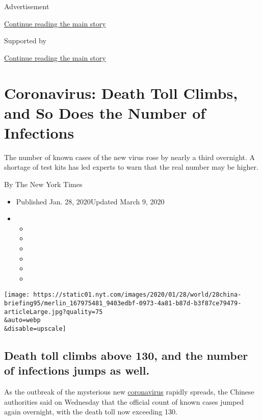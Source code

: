 Advertisement

\protect\hyperlink{after-top}{Continue reading the main story}

Supported by

\protect\hyperlink{after-sponsor}{Continue reading the main story}

\hypertarget{coronavirus-death-toll-climbs-and-so-does-the-number-of-infections}{%
\section{Coronavirus: Death Toll Climbs, and So Does the Number of
Infections}\label{coronavirus-death-toll-climbs-and-so-does-the-number-of-infections}}

The number of known cases of the new virus rose by nearly a third
overnight. A shortage of test kits has led experts to warn that the real
number may be higher.

By The New York Times

\begin{itemize}
\item
  Published Jan. 28, 2020Updated March 9, 2020
\item
  \begin{itemize}
  \item
  \item
  \item
  \item
  \item
  \item
  \end{itemize}
\end{itemize}

\texttt{[image: https://static01.nyt.com/images/2020/01/28/world/28china-briefing95/merlin\_167975481\_9403edbf-0973-4a81-b87d-b3f87ce79479-articleLarge.jpg?quality=75\\\&auto=webp\\\&disable=upscale]}

\hypertarget{death-toll-climbs-above-130-and-the-number-of-infections-jumps-as-well}{%
\subsection{Death toll climbs above 130, and the number of infections
jumps as
well.}\label{death-toll-climbs-above-130-and-the-number-of-infections-jumps-as-well}}

As the outbreak of the mysterious new
\href{http://www.nytimes.com/2020/03/09/world/coronavirus-news.html}{coronavirus}
rapidly spreads, the Chinese authorities said on Wednesday that the
official count of known cases jumped again overnight, with the death
toll now exceeding 130.

